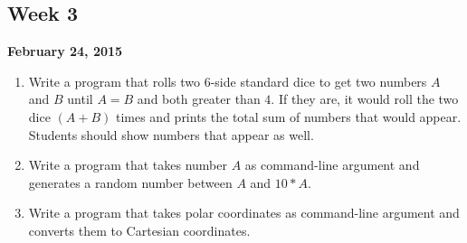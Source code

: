 \documentclass[12pt,letterpaper,twoside]{article}
\begin{document}




\subsection*{Week 3}
\hfill \textbf{February 24, 2015}

\begin{enumerate}\itemsep=0pt
\item Write a program that rolls two 6-side standard dice to get two numbers $A$ and $B$ until $A = B$ and both greater than $4$. If they are, it would roll the two dice $(A + B)$ times and prints the total sum of numbers that would appear. Students should show numbers that appear as well.
\item Write a program that takes number $A$ as command-line argument and generates a random number between $A$ and $10*A$.
\item Write a program that takes polar coordinates as command-line argument and converts them to Cartesian coordinates.
\end{enumerate}
\end{document}
